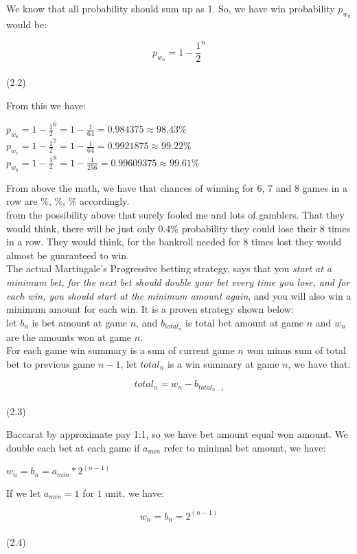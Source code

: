 \documentclass{article}
\begin{document}
We know that all probability should sum up as 1. So, we have win probability $p_{w_n}$ would be:\par
\begin{center}
	$$p_{w_n}=1-\frac{1}{2}^n$$\\(2.2)\\
\end{center}
  From this we have:\\
\begin{center}
	$p_{w_6}=1-\frac{1}{2}^6=1-\frac{1}{64}=0.984375\approx98.43\%$\\
	$p_{w_7}=1-\frac{1}{2}^7=1-\frac{1}{64}=0.9921875\approx99.22\%$\\
	$p_{w_8}=1-\frac{1}{2}^8=1-\frac{1}{256}=0.99609375\approx99.61\%$\\
\end{center}

From above the math, we have that chances of winning for 6, 7 and 8 games in a row are \%, \%, \% accordingly.  \\

from the possibility above that surely fooled me and lots of gamblers.  That they would think, there will be just only 0.4\% probability they could lose their 8 times in a row.  They would think, for the bankroll needed for 8 times lost they would almost be guaranteed to win.\\

The actual Martingale's Progressive betting strategy, says that you \emph{start at a minimum bet, for the next bet should double your bet every time you lose, and for each win, you should start at the minimum amount again}, and you will also win a minimum amount for each win.  It is a proven strategy shown below:\\

let $b_n$ is bet amount at game $n$, and $b_{total_n}$ is total bet amount at game $n$ and $w_n$ are the amounts won at game $n$. \\

For each game win summary is a sum of current game $n$ won minus sum of total bet to previous game $n-1$, let $total_n$ is a win summary at game $n$, we have that:\par
\begin{center}
$$total_n = w_n - b_{total_{n-1}}$$\\(2.3)\\
\end{center}

Baccarat by approximate pay 1:1, so we have bet amount equal won amount.  We double each bet at each game if $a_{min}$ refer to minimal bet amount, we have:\par
\begin{center}
 $w_n = b_n = a_{min} * 2^{(n-1)}$\\
\end{center}
If we let $a_{min}=1$ for $1$ unit, we have:
\begin{center}
 $$w_n = b_n = 2^{(n-1)}$$\\(2.4)\\
\end{center}
\end{document}
